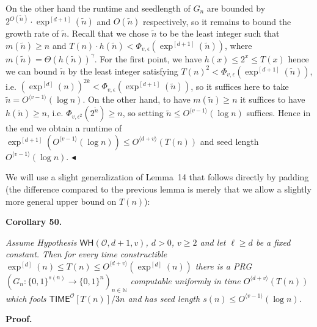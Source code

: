 On the other hand the runtime and seedlength of $G_{n}$ are bounded by $2^{O(\tilde{n})}\cdot\exp^{[d+1]}(\tilde{n})$ and $O(\tilde{n})$ respectively, so it remains to bound the growth rate of $\tilde{n}$. Recall that we chose $\tilde{n}$ to be the least integer such that $m(\tilde{n})\geq n$ and $T(n)\cdot h(\tilde{n})<\Phi_{v,\epsilon}(\exp^{[d+1]}(\tilde{n}))$, where $m(\tilde{n})=\Theta(h(\tilde{n}))^{\gamma}$. For the first point, we have $h(x)\leq 2^{x}\leq T(x)$ hence we can bound $\tilde{n}$ by the least integer satisfying $T(n)^{2}<\Phi_{v,\epsilon}(\exp^{[d+1]}(\tilde{n}))$, i.e. $(\exp^{[d]}(n))^{2k}<\Phi_{v,\epsilon}(\exp^{[d+1]}(\tilde{n}))$, so it suffices here to take $\tilde{n}=O^{\langle v-1\rangle}(\log n)$. On the other hand, to have $m(\tilde{n})\geq n$ it suffices to have $h(\tilde{n})\geq n$, i.e. $\Phi_{v,\epsilon^{2}}(2^{\tilde{n}})\geq n$, so setting $\tilde{n}\leq O^{\langle v-1\rangle}(\log n)$ suffices. Hence in the end we obtain a runtime of $\exp^{[d+1]}(O^{\langle v-1\rangle}(\log n))\leq O^{\langle d+v\rangle}(T(n))$ and seed length $O^{\langle v-1\rangle}(\log n)$.
$\blacktriangleleft$\par




We will use a slight generalization of Lemma 14 that follows directly by padding (the difference compared to the previous lemma is merely that we allow a slightly more general upper bound on $T(n)$):\par





\par\medskip\noindent\textbf{
\textbf{Corollary 50}\textbf{.}
}\par



\emph{Assume Hypothesis $\mathsf{WH}(\mathcal{O},d+1,v)$, $d>0$, $v\geq 2$ and let $\ell\geq d$ be a fixed constant. Then for every time constructible $\exp^{[d]}(n)\leq T(n)\leq O^{\langle d+v\rangle}(\exp^{[d]}(n))$ there is a PRG $(G_{n}:\{0,1\}^{s(n)}\to\{0,1\}^{n})_{n\in\mathbb{N}}$ computable uniformly in time $O^{\langle d+v\rangle}(T(n))$ which fools ${\mathsf{TIME}}^{\mathcal{O}}[T(n)]/3n$ and has seed length $s(n)\leq O^{\langle v-1\rangle}(\log n)$.}\par







\par\medskip\noindent\textbf{Proof.}\par




